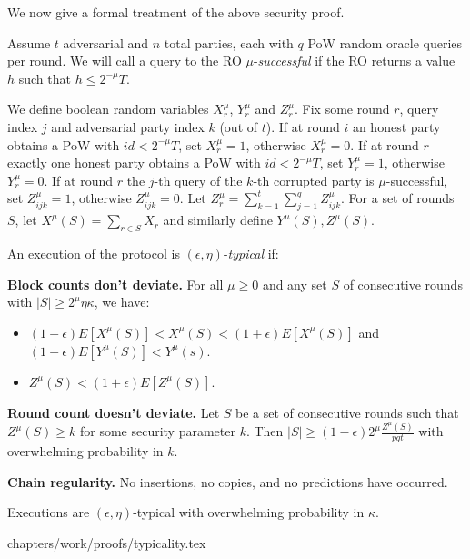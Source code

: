 We now give a formal treatment of the above security proof.

Assume $t$ adversarial and $n$ total parties, each with $q$
PoW random oracle queries per round. We will call a query to the
RO $\mu$-\emph{successful} if the RO returns a value $h$
such that $h \leq 2^{-\mu}T$.

We define boolean random variables $X_r^\mu$, $Y_r^\mu$ and $Z_r^\mu$. Fix some
round $r$, query index $j$ and adversarial party index $k$ (out of $t$). If at
round $i$ an honest party obtains a PoW with $id < 2^{-\mu}T$, set $X_r^\mu =
1$, otherwise $X_r^\mu = 0$. If at round $r$ exactly one honest party obtains a
PoW with $id < 2^{-\mu}T$, set $Y_r^\mu = 1$, otherwise $Y_r^\mu = 0$. If at
round $r$ the $j$-th query of the $k$-th corrupted party is $\mu$-successful,
set $Z^\mu_{ijk} = 1$, otherwise $Z^\mu_{ijk} = 0$. Let $Z^\mu_r = \sum_{k=1}^t
\sum_{j=1}^q Z^\mu_{ijk}$. For a set of rounds $S$, let $X^\mu(S) = \sum_{r \in
S} X_r$ and similarly define $Y^\mu(S), Z^\mu(S)$.

\begin{definition}
    An execution of the protocol is $(\epsilon, \eta)$-\emph{typical} if:

    \textnormal{\bf Block counts don't deviate.}
    For all $\mu \geq 0$ and any set $S$ of consecutive rounds
    with $|S| \geq 2^\mu \eta\kappa$, we have:

    \begin{itemize}
        \item $(1 - \epsilon)E[X^\mu(S)] < X^\mu(S) < (1 + \epsilon)E[X^\mu(S)]$ and $(1 - \epsilon)E[Y^\mu(S)] < Y^\mu(s)$.
        \item $Z^\mu(S) < (1 + \epsilon)E[Z^\mu(S)]$.
    \end{itemize}

    \textnormal{\bf Round count doesn't deviate.}
    Let $S$ be a set of consecutive rounds such that $Z^\mu(S)
    \geq k$ for some security parameter $k$. Then $|S| \geq (1 -
    \epsilon)2^\mu\frac{Z^\mu(S)}{pqt}$ with overwhelming probability in $k$.

    \textnormal{\bf Chain regularity.}
    No insertions, no copies, and no predictions \cite{backbone} have occurred.
\end{definition}

\begin{theorem}[Typicality]
\label{thm.typicality}
Executions are $(\epsilon, \eta)$-typical with overwhelming
probability in $\kappa$.
\end{theorem}
{chapters/work/proofs/typicality.tex}

